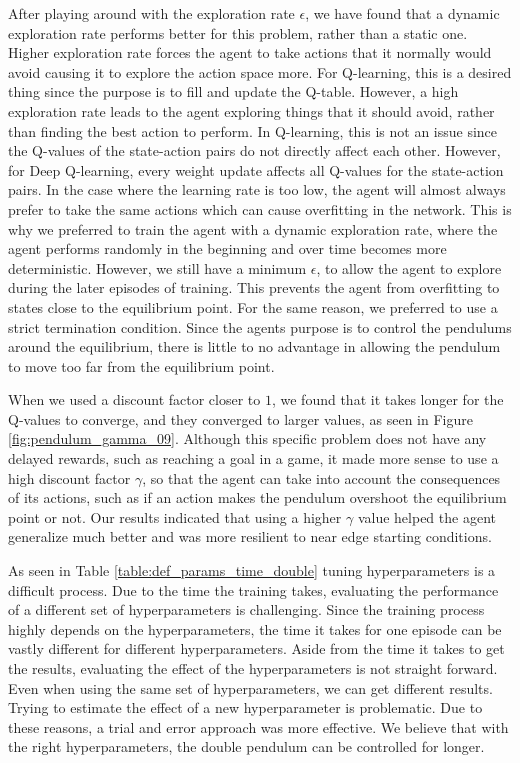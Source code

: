 \documentclass[final]{LTHtwocol} %
\begin{document}
After playing around with the exploration rate $\epsilon$, we have found that a dynamic exploration rate performs better for this problem, rather than a static one.
Higher exploration rate forces the agent to take actions that it normally would avoid causing it to explore the action space more.
For Q-learning, this is a desired thing since the purpose is to fill and update the Q-table.
However, a high exploration rate leads to the agent exploring things that it should avoid, rather than finding the best action to perform.
In Q-learning, this is not an issue since the Q-values of the state-action pairs do not directly affect each other.
However, for Deep Q-learning, every weight update affects all Q-values for the state-action pairs.
In the case where the learning rate is too low, the agent will almost always prefer to take the same actions which can cause overfitting in the network.
This is why we preferred to train the agent with a dynamic exploration rate, where the agent performs randomly in the beginning and over time becomes more deterministic.
However, we still have a minimum $\epsilon$, to allow the agent to explore during the later episodes of training.
This prevents the agent from overfitting to states close to the equilibrium point.
For the same reason, we preferred to use a strict termination condition. 
Since the agents purpose is to control the pendulums around the equilibrium, there is little to no advantage in allowing the pendulum to move too far from the equilibrium point.

When we used a discount factor closer to $1$, we found that it takes longer for the Q-values to converge, and they converged to larger values, as seen in Figure \ref{fig:pendulum_gamma_09}.
Although this specific problem does not have any delayed rewards, such as reaching a goal in a game, it made more sense to use a high discount factor $\gamma$, so that the agent can take into account the consequences of its actions, such as if an action makes the pendulum overshoot the equilibrium point or not.
Our results indicated that using a higher $\gamma$ value helped the agent generalize much better and was more resilient to near edge starting conditions.

As seen in Table \ref{table:def_params_time_double} tuning hyperparameters is a difficult process. 
Due to the time the training takes, evaluating the performance of a different set of hyperparameters is challenging.
Since the training process highly depends on the hyperparameters, the time it takes for one episode can be vastly different for different hyperparameters.
Aside from the time it takes to get the results, evaluating the effect of the hyperparameters is not straight forward.
Even when using the same set of hyperparameters, we can get different results.
Trying to estimate the effect of a new hyperparameter is problematic.
Due to these reasons, a trial and error approach was more effective.
We believe that with the right hyperparameters, the double pendulum can be controlled for longer.
\end{document}
